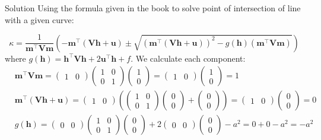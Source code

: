 \documentclass{beamer}
\newcommand{\myvec}[1]{\ensuremath{\begin{pmatrix}#1\end{pmatrix}}}
\begin{document}
\begin{frame}{Solution}
Using the formula given in the  book to solve point of intersection of line with a given curve:

\[
\kappa = \frac{1}{\mathbf{m}^\top\mathbf{V}\mathbf{m}} \left( -\mathbf{m}^\top(\mathbf{V}\mathbf{h} + \mathbf{u}) \pm \sqrt{ (\mathbf{m}^\top(\mathbf{V}\mathbf{h} + \mathbf{u}))^2 - g(\mathbf{h})(\mathbf{m}^\top\mathbf{V}\mathbf{m}) } \right)
\]
where $g(\mathbf{h}) = \mathbf{h}^\top\mathbf{V}\mathbf{h} + 2\mathbf{u}^\top\mathbf{h} + f$. We calculate each component:
\begin{align}
	&\mathbf{m}^\top\mathbf{V}\mathbf{m} = \myvec{1 & 0} \myvec{1 & 0 \\ 0 & 1} \myvec{1 \\ 0} = \myvec{1 & 0} \myvec{1 \\ 0} = 1\\
	&\mathbf{m}^\top(\mathbf{V}\mathbf{h} + \mathbf{u}) = \myvec{1 & 0} \left( \myvec{1 & 0 \\ 0 & 1} \myvec{0 \\ 0} + \myvec{0 \\ 0} \right) = \myvec{1 & 0} \myvec{0 \\ 0} = 0\\
	&g(\mathbf{h}) = \myvec{0 & 0}\myvec{1 & 0 \\ 0 & 1}\myvec{0 \\ 0} + 2\myvec{0 & 0}\myvec{0 \\ 0} - a^2 = 0 + 0 - a^2 = -a^2
\end{align}
\end{frame}
\end{document}
